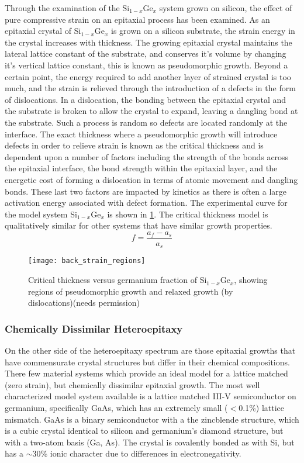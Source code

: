 Through the examination of the Si$_{1-x}$Ge$_x$ system grown on silicon, the effect of pure compressive strain on an epitaxial process has been examined. As an epitaxial crystal of Si$_{1-x}$Ge$_x$ is grown on a silicon substrate, the strain energy in the crystal increases with thickness. The growing epitaxial crystal maintains the lateral lattice constant of the substrate, and conserves it's volume by changing it's vertical lattice constant, this is known as pseudomorphic growth. Beyond a certain point, the energy required to add another layer of strained crystal is too much, and the strain is relieved through the introduction of a defects in the form of dislocations. In a dislocation, the bonding between the epitaxial crystal and the substrate is broken to allow the crystal to expand, leaving a dangling bond at the substrate. Such a process is random so defects are located randomly at the interface. The exact thickness where a pseudomorphic growth will introduce defects in order to relieve strain is known as the critical thickness and is dependent upon a number of factors including the strength of the bonds across the epitaxial interface, the bond strength within the epitaxial layer, and the energetic cost of forming a dislocation in terms of atomic movement and dangling bonds. These last two factors are impacted by kinetics as there is often a large activation energy associated with defect formation. The experimental curve for the model system Si$_{1-x}$Ge$_x$  is shown in \cref{fig:back_strain_regions}. The critical thickness model is qualitatively similar for other systems that have similar growth properties.
\begin{equation}
f = \frac{a_f - a_s}{a_s} \label{eqn:mismatch}
\end{equation}
\begin{figure}
    \centering
    \texttt{[image: back\_strain\_regions]}
    \caption[Critical thickness dependence on strain]{\label{fig:back_strain_regions}Critical thickness versus germanium fraction of Si$_{1-x}$Ge$_x$, showing regions of pseudomorphic growth and relaxed growth (by dislocations)\cite{Bean1986}(needs permission)}
\end{figure}
\subsubsection{Chemically Dissimilar Heteroepitaxy}
On the other side of the heteroepitaxy spectrum are those epitaxial growths that have commensurate crystal structures but differ in their chemical compositions. There few material systems which provide an ideal model for a lattice matched (zero strain), but chemically dissimilar epitaxial growth. The most well characterized model system available is a lattice matched III-V semiconductor on germanium, specifically GaAs, which has an extremely small ($<$0.1\%) lattice mismatch. GaAs is a binary semiconductor with a the zincblende structure, which is a cubic crystal identical to silicon and germanium's diamond structure, but with a two-atom basis (Ga, As). The crystal is covalently bonded as with Si, but has a $\sim$30\% ionic character due to differences in electronegativity\cite{Christensen1987}.

